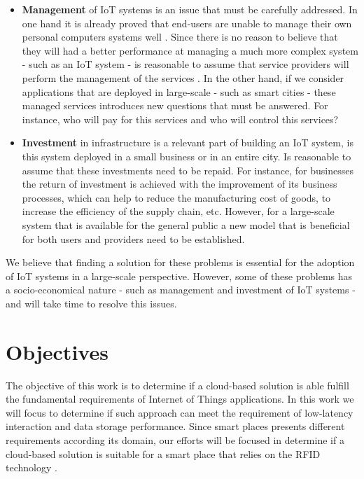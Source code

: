 \begin{itemize}
  \item \textbf{Management} of IoT systems is an issue that must be carefully addressed. In one hand
  it is already proved that end-users are unable to manage their own personal computers systems well
  \cite{doll1988measurement}. Since there is no reason to believe that they will had a better
  performance at managing a much more complex system - such as an \gls{IoT} system - is reasonable to
  assume that service providers will perform the management of the services . In the other hand, if we
  consider applications that are deployed in large-scale - such as smart cities - these managed
  services introduces new questions that must be answered. For instance, who will pay for this
  services and who will control this services?
  \item \textbf{Investment} in infrastructure is a relevant part of building an \gls{IoT} system,
  is this system deployed in a small business or in an entire city. Is reasonable to assume that
  these investments need to be repaid. For instance, for businesses the return of investment is
  achieved with the improvement of its business processes, which can help to reduce the manufacturing
  cost of goods, to increase the efficiency of the supply chain, etc. However, for a large-scale
  system that is available for the general public a new model that is beneficial for both users and
  providers need to be established.
\end{itemize}

We believe that finding a solution for these problems is essential for the adoption of \gls{IoT} systems
in a large-scale perspective. However, some of these problems has a socio-economical nature - such as
management and investment of \gls{IoT} systems - and will take time to resolve this issues.

\section{Objectives}
\label{section:objectives}
The objective of this work is to determine if a cloud-based solution is able fulfill the fundamental
requirements of Internet of Things applications. In this work we will focus to determine if such approach
can meet the requirement of low-latency interaction and data storage performance. Since smart places
presents different requirements according its domain, our efforts will be focused in determine if a
cloud-based solution is suitable for a smart place that relies on the RFID technology \cite{want2006introduction}.\\

